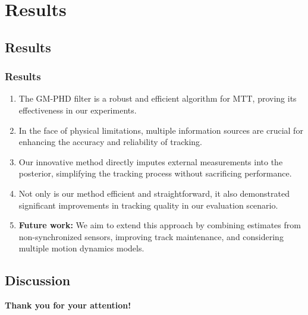 \section{Results}

\subsection*{Results}\begin{frame}\frametitle{Results}
    \begin{enumerate}
       \item The GM-PHD filter is a robust and efficient algorithm for MTT, proving its effectiveness in our experiments.
       \pause
        \item In the face of physical limitations, multiple information sources are crucial for enhancing the accuracy and reliability of tracking.
        \pause
        \item Our innovative method directly imputes external measurements into the posterior, simplifying the tracking process without sacrificing performance.
        \pause
        \item Not only is our method efficient and straightforward, it also demonstrated significant improvements in tracking quality in our evaluation scenario.
        \pause
        \item \textbf{Future work:} We aim to extend this approach by combining estimates from non-synchronized sensors, improving track maintenance, and considering multiple motion dynamics models.
    \end{enumerate}
\end{frame}

\subsection*{Discussion}
\begin{frame}
    \begin{center}
    \vspace*{1cm}
    {\bf Thank you for your attention!}\\
    \vspace*{2cm}
    {\bf\Large \FirstName{} \LastName{}}\\
    {\tt \Email}
    \vspace*{1cm}
    \end{center}
    \vfill
\end{frame}
